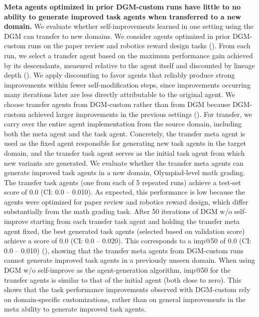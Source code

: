 \documentclass[]{fairmeta}
\begin{document}
\textbf{Meta agents optimized in prior DGM-custom runs have little to no ability to generate improved task agents when transferred to a new domain.}
We evaluate whether self-improvements learned in one setting using the DGM can transfer to new domains. We consider agents optimized in prior DGM-custom runs on the paper review and robotics reward design tasks (). From each run, we select a transfer agent based on the maximum performance gain achieved by its descendants, measured relative to the agent itself and discounted by lineage depth (). We apply discounting to favor agents that reliably produce strong improvements within fewer self-modification steps, since improvements occurring many iterations later are less directly attributable to the original agent. We choose transfer agents from DGM-custom rather than from DGM because DGM-custom achieved larger improvements in the previous settings ().
For transfer, we carry over the entire agent implementation from the source domain, including both the meta agent and the task agent. Concretely, the transfer meta agent is used as the fixed agent responsible for generating new task agents in the target domain, and the transfer task agent serves as the initial task agent from which new variants are generated.
We evaluate whether the transfer meta agents can generate improved task agents in a new domain, Olympiad-level math grading. The transfer task agents (one from each of 5 repeated runs) achieve a test-set score of 0.0 (CI: 0.0 -- 0.010). As expected, this performance is low because the agents were optimized for paper review and robotics reward design, which differ substantially from the math grading task.
After 50 iterations of DGM w/o self-improve starting from each transfer task agent and holding the transfer meta agent fixed, the best generated task agents (selected based on validation score) achieve a score of 0.0 (CI: 0.0 -- 0.020). This corresponds to a imp@50 of 0.0 (CI: 0.0 -- 0.010) (), showing that the transfer meta agents from DGM-custom runs cannot generate improved task agents in a previously unseen domain.
When using DGM w/o self-improve as the agent-generation algorithm, imp@50 for the transfer agents is similar to that of the initial agent (both close to zero). This shows that the task performance improvements observed with DGM-custom rely on domain-specific customizations, rather than on general improvements in the meta ability to generate improved task agents.
\end{document}
